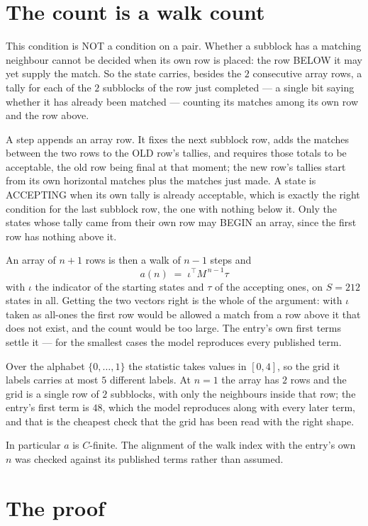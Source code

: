 \documentclass[11pt,a4paper]{article}
\theoremstyle{plain}
\theoremstyle{definition}
\begin{document}
\section{The count is a walk count}

This condition is NOT a condition on a pair. Whether a subblock has a
matching neighbour cannot be decided when its own row is placed: the row BELOW it may yet
supply the match. So the state carries, besides the $2$ consecutive array rows, a tally for
each of the $2$ subblocks of the row just completed --- a single bit saying whether it has already been matched --- counting its matches
among its own row and the row above.

A step appends an array row. It fixes the next subblock row, adds the matches between the two
rows to the OLD row's tallies, and requires those totals to be acceptable, the old row being
final at that moment; the new row's tallies start from its own horizontal matches plus the
matches just made. A state is ACCEPTING when its own tally is already acceptable, which is
exactly the right condition for the last subblock row, the one with nothing below it. Only the
states whose tally came from their own row may BEGIN an array, since the first row has nothing
above it.

An array of $n+1$ rows is then a walk of $n-1$ steps and
\[
a(n)\;=\;\iota^{\!\top}M^{\,n-1}\tau
\]
with $\iota$ the indicator of the starting states and $\tau$ of the accepting ones, on
$S=212$ states in all. Getting the two vectors right is the whole of the argument: with
$\iota$ taken as all-ones the first row would be allowed a match from a row above it that does
not exist, and the count would be too large. The entry's own first terms settle it --- for
the smallest cases
the model reproduces every published term.

Over the alphabet $\{0,\dots,1\}$ the statistic takes values in $[0,4]$, so the
grid it labels carries at most $5$ different labels. At $n=1$ the array has $2$
rows and the grid is a single row of $2$
subblocks, with only the neighbours inside that row; the entry's first term is
$48$, which the model reproduces along with every later term, and that is the cheapest
check that the grid has been read with the right shape.

In particular $a$ is $C$-finite. The alignment of the walk index with the entry's own $n$ was
checked against its published terms rather than assumed.

\section{The proof}
\end{document}
